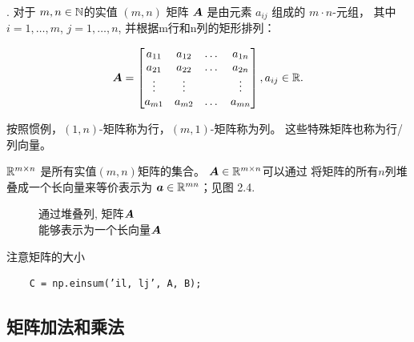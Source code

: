 \begin{definition}[矩阵].
    对于 $m, n \in \mathbb{N}$的实值 $(m, n)$ 矩阵 $\boldsymbol{A}$
    是由元素 $a_{ij}$ 组成的 $m \cdot n$-元组，
    其中$i = 1, \dots, m$, $j = 1,\dots, n$,
    并根据m行和n列的矩形排列：

    \begin{equation}
        \boldsymbol{A} =
        \begin{bmatrix}
            a_{11} & a_{12} & \dots & a_{1n} \\
            a_{21} & a_{22} & \dots & a_{2n} \\
            \vdots & \vdots &       & \vdots \\
            a_{m1} & a_{m2} & \dots & a_{mn}
        \end{bmatrix},
        a_{ij} \in \mathbb{R}.
    \end{equation}
\end{definition}
按照惯例，$(1, n)$-矩阵称为行，$(m, 1)$-矩阵称为列。
这些特殊矩阵也称为行/列向量。

$\mathbb{R}^{m \times n}$ 是所有实值$(m, n)$矩阵的集合。
$\boldsymbol{A} \in \mathbb{R}^{m \times n}$可以通过
将矩阵的所有$n$列堆叠成一个长向量来等价表示为
$\boldsymbol{a} \in \mathbb{R}^{mn}$；见图 2.4.

\begin{figure}[H]
    \caption{通过堆叠列, 矩阵$\boldsymbol{A}$\\能够表示为一个长向量$\boldsymbol{A}$}
\end{figure}

注意矩阵的大小
\begin{verbatim}
    C = np.einsum(’il, lj’, A, B);
\end{verbatim}

\subsection{矩阵加法和乘法}

